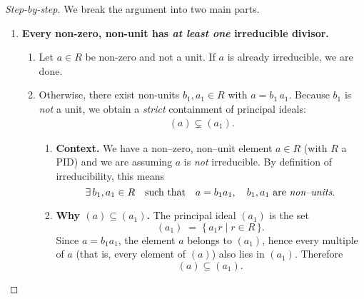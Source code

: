 \documentclass[12pt]{article}
\theoremstyle{definition} %
\theoremstyle{plain} %
\begin{document}
\begin{proof}[Step-by-step]
    We break the argument into two main parts.

    \begin{enumerate}[label=\textbf{Part \arabic*:}, leftmargin=1.5em]

        \item \textbf{Every non-zero, non-unit has \emph{at least one}
              irreducible divisor.}

              \begin{enumerate}[label=\arabic*. , leftmargin=2em]
                  \item Let $a\in R$ be non-zero and not a unit.
                        If $a$ is already irreducible, we are done.

                  \item Otherwise, there exist non-units $b_{1},a_{1}\in R$
                        with $a = b_{1}\,a_{1}$.
                        Because $b_{1}$ is \emph{not} a unit, we obtain a
                        \emph{strict} containment of principal ideals:
                        \begin{align}
                            (a) \subsetneq (a_{1}).
                        \end{align}

\begin{enumerate}[label=\arabic*. , leftmargin=2em]
  \item[] \textbf{Context.}  
        We have a non–zero, non–unit element $a\in R$ (with $R$ a PID) 
        and we are assuming $a$ is \emph{not} irreducible.  
        By definition of irreducibility, this means
        \[
            \exists\,b_{1},a_{1}\in R\quad 
            \text{such that}\quad
            a = b_{1}a_{1},
            \quad
            b_{1},a_{1}\ \text{are \emph{non–units}.}
        \]

  \item \textbf{Why $(a)\subseteq(a_{1})$.}  
        The principal ideal $(a_{1})$ is the set
        \[
            (a_{1}) \;=\; \{\,a_{1}r \mid r\in R\,\}.
        \]
        Since $a = b_{1}a_{1}$, the element $a$ belongs to $(a_{1})$,
        hence every multiple of $a$ (that is, every element of $(a)$)
        also lies in $(a_{1})$.  Therefore
        \[
            (a)\subseteq(a_{1}).
        \]


\end{enumerate}
\end{enumerate}
\end{enumerate}
\end{proof}
\end{document}
